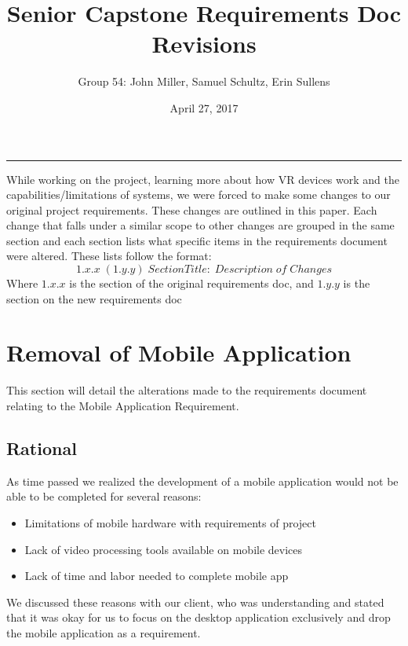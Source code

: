 \documentclass[10pt,letterpaper,onecolumn]{article}
\title{Senior Capstone Requirements Doc Revisions}
\author{Group 54: John Miller, Samuel Schultz, Erin Sullens}
\date{April 27, 2017}
\begin{document}
\maketitle
\vspace{-0.3in}
\noindent
\rule{\linewidth}{0.4pt}

\noindent
While working on the project, learning more about how VR devices work and the capabilities/limitations of systems, we were forced to make some changes to our original project requirements.
These changes are outlined in this paper.
Each change that falls under a similar scope to other changes are grouped in the same section and each section lists what specific items in the requirements document were altered.
These lists follow the format:
\begin{equation}
  1.x.x \; (1.y.y) \; Section Title: \; Description \; of \; Changes
\end{equation}
Where $1.x.x$ is the section of the original requirements doc, and $1.y.y$ is the section on the new requirements doc

\section{Removal of Mobile Application}
This section will detail the alterations made to the requirements document relating to the Mobile Application Requirement.
\subsection{Rational}
As time passed we realized the development of a mobile application would not be able to be completed for several reasons:
\begin{itemize}
  \item Limitations of mobile hardware with requirements of project
  \item Lack of video processing tools available on mobile devices
  \item Lack of time and labor needed to complete mobile app
\end{itemize}
We discussed these reasons with our client, who was understanding and stated that it was okay for us to focus on the desktop application exclusively and drop the mobile application as a requirement.
\end{document}
